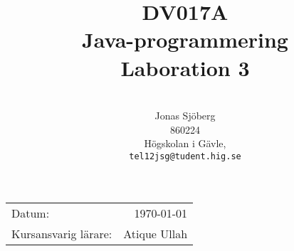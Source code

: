 \documentclass[11pt,a4paper]{article}
\title{DV017A \\ Java-programmering \\ Laboration 3}
\author{\\
  Jonas Sjöberg\\
  860224\\
  Högskolan i Gävle,\\
  \texttt{tel12jsg@tudent.hig.se}
}
\date{}
\begin{document}
    \maketitle

    \begin{center}
    \begin{tabular}{l r}
        Datum: & \today \par \\
        Kursansvarig lärare: & Atique Ullah
    \end{tabular}
    \end{center}

    \begin{abstract}
    \end{abstract}

    \newpage
    \setcounter{tocdepth}{3}
    \tableofcontents
    \newpage

    
    
    
    
    
    
\end{document}
